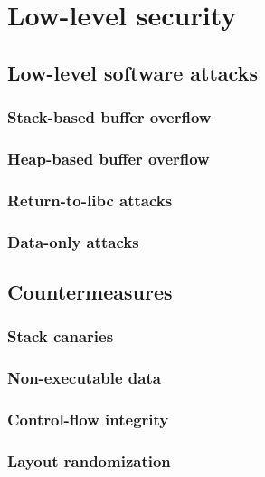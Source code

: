 \chapter{Low-level security}\label{chapter:low-level-security}

\section{Low-level software attacks}

\subsection{Stack-based buffer overflow}

\subsection{Heap-based buffer overflow}
\subsection{Return-to-libc attacks}
\subsection{Data-only attacks}


\section{Countermeasures}

\subsection{Stack canaries}
\subsection{Non-executable data}
\subsection{Control-flow integrity}
\subsection{Layout randomization}

